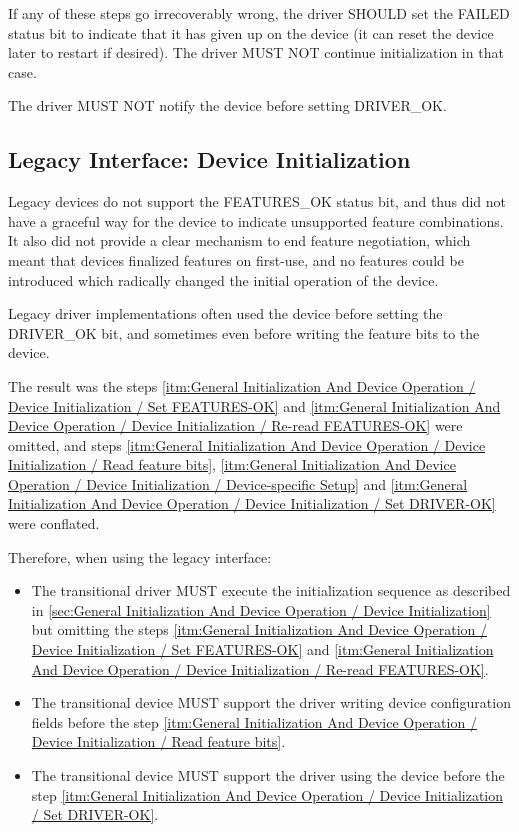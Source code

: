 If any of these steps go irrecoverably wrong, the driver SHOULD
set the FAILED status bit to indicate that it has given up on the
device (it can reset the device later to restart if desired).  The
driver MUST NOT continue initialization in that case.

The driver MUST NOT notify the device before setting DRIVER_OK.

\subsection{Legacy Interface: Device Initialization}\label{sec:General Initialization And Device Operation / Device Initialization / Legacy Interface: Device Initialization}
Legacy devices do not support the FEATURES_OK status bit, and thus did
not have a graceful way for the device to indicate unsupported feature
combinations.  It also did not provide a clear mechanism to end
feature negotiation, which meant that devices finalized features on
first-use, and no features could be introduced which radically changed
the initial operation of the device.

Legacy driver implementations often used the device before setting the
DRIVER_OK bit, and sometimes even before writing the feature bits
to the device.

The result was the steps \ref{itm:General Initialization And
Device Operation / Device Initialization / Set FEATURES-OK} and
\ref{itm:General Initialization And Device Operation / Device
Initialization / Re-read FEATURES-OK} were omitted, and steps
\ref{itm:General Initialization And Device Operation /
Device Initialization / Read feature bits},
\ref{itm:General Initialization And Device Operation / Device Initialization / Device-specific Setup} and \ref{itm:General Initialization And Device Operation / Device Initialization / Set DRIVER-OK}
were conflated.

Therefore, when using the legacy interface:
\begin{itemize}
\item
The transitional driver MUST execute the initialization
sequence as described in \ref{sec:General Initialization And Device
Operation / Device Initialization}
but omitting the steps \ref{itm:General Initialization And Device
Operation / Device Initialization / Set FEATURES-OK} and
\ref{itm:General Initialization And Device Operation / Device
Initialization / Re-read FEATURES-OK}.

\item
The transitional device MUST support the driver
writing device configuration fields
before the step \ref{itm:General Initialization And Device Operation /
Device Initialization / Read feature bits}.
\item
The transitional device MUST support the driver
using the device before the step \ref{itm:General Initialization
And Device Operation / Device Initialization / Set DRIVER-OK}.
\end{itemize}

